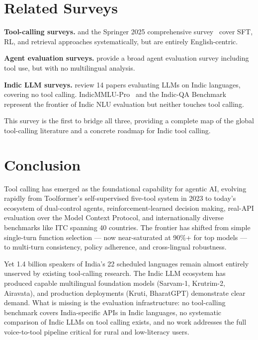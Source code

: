 \documentclass[11pt]{article}
\begin{document}
\section{Related Surveys}
\label{sec:related}

\textbf{Tool-calling surveys.}
\citet{wangsurvey2024} and the Springer 2025 comprehensive survey~\citep{springersurvey2025} cover
SFT, RL, and retrieval approaches systematically, but are entirely English-centric.

\textbf{Agent evaluation surveys.}
\citet{agentsurvey2025} provide a broad agent evaluation survey including tool use, but with no
multilingual analysis.

\textbf{Indic LLM surveys.}
\citet{indicanalysis2025} review 14 papers evaluating LLMs on Indic languages, covering no tool
calling. IndicMMLU-Pro~\citep{indicmmlupro2025} and the Indic-QA Benchmark~\citep{indicqa2025}
represent the frontier of Indic NLU evaluation but neither touches tool calling.

This survey is the first to bridge all three, providing a complete map of the global tool-calling
literature and a concrete roadmap for Indic tool calling.

\section{Conclusion}
\label{sec:conclusion}

Tool calling has emerged as the foundational capability for agentic AI, evolving rapidly from
Toolformer's self-supervised five-tool system in 2023 to today's ecosystem of dual-control agents,
reinforcement-learned decision making, real-API evaluation over the Model Context Protocol, and
internationally diverse benchmarks like ITC spanning 40 countries. The frontier has shifted from
simple single-turn function selection --- now near-saturated at 90\%+ for top models --- to
multi-turn consistency, policy adherence, and cross-lingual robustness.

Yet 1.4 billion speakers of India's 22 scheduled languages remain almost entirely unserved by
existing tool-calling research. The Indic LLM ecosystem has produced capable multilingual foundation
models (Sarvam-1, Krutrim-2, Airavata), and production deployments (Kruti, BharatGPT) demonstrate
clear demand. What is missing is the evaluation infrastructure: no tool-calling benchmark covers
India-specific APIs in Indic languages, no systematic comparison of Indic LLMs on tool calling
exists, and no work addresses the full voice-to-tool pipeline critical for rural and low-literacy
users.
\end{document}
